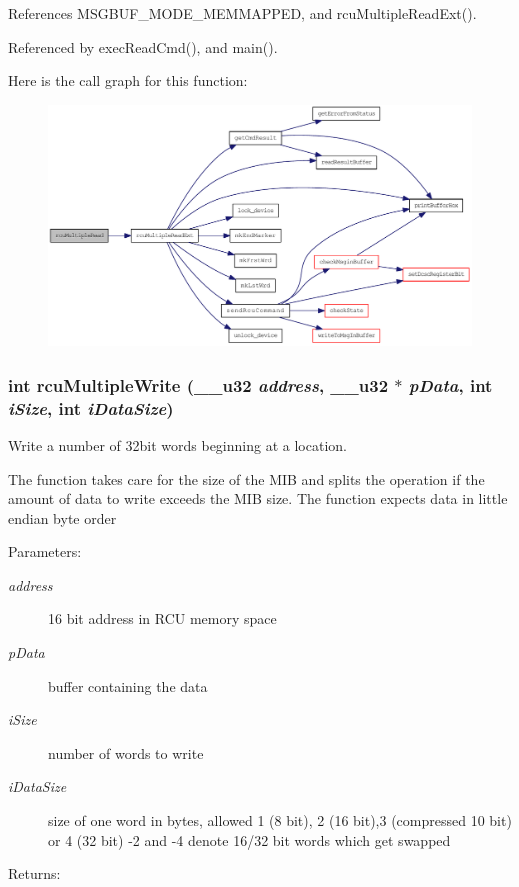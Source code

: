 References MSGBUF\_\-MODE\_\-MEMMAPPED, and rcu\-Multiple\-Read\-Ext().

Referenced by exec\-Read\-Cmd(), and main().

Here is the call graph for this function:\begin{figure}[H]
\begin{center}
\leavevmode
\includegraphics[width=356pt]{group__dcsc__msg__buffer__access_g602216accce6913989f8b04b36157cd6_cgraph}
\end{center}
\end{figure}
\hypertarget{group__dcsc__msg__buffer__access_ge20afbfc92c897546e37126188804309}{
\subsubsection[rcuMultipleWrite]{\setlength{\rightskip}{0pt plus 5cm}int rcu\-Multiple\-Write (\_\-\_\-u32 {\em address}, \_\-\_\-u32 $\ast$ {\em p\-Data}, int {\em i\-Size}, int {\em i\-Data\-Size})}}
\label{group__dcsc__msg__buffer__access_ge20afbfc92c897546e37126188804309}


Write a number of 32bit words beginning at a location. 

The function takes care for the size of the MIB and splits the operation if the amount of data to write exceeds the MIB size. The function expects data in little endian byte order \begin{Desc}
\item[Parameters:]
\begin{description}
\item[{\em address}]16 bit address in RCU memory space \item[{\em p\-Data}]buffer containing the data \item[{\em i\-Size}]number of words to write \item[{\em i\-Data\-Size}]size of one word in bytes, allowed 1 (8 bit), 2 (16 bit),3 (compressed 10 bit) or 4 (32 bit) -2 and -4 denote 16/32 bit words which get swapped \end{description}
\end{Desc}
\begin{Desc}
\item[Returns:]\end{Desc}


